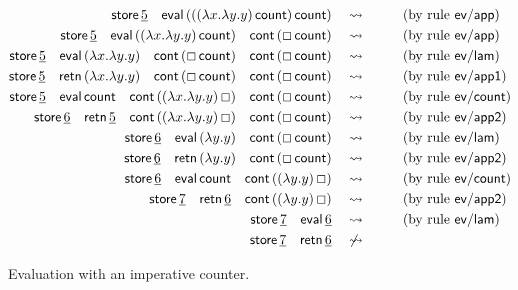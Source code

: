 \begin{figure}
\begin{align*}
{\sf store}\,\underline 5 \quad
{\sf eval}\,(((\lambda x.\lambda y.y)\,{\sf count})\,{\sf count})
& ~~~\rightsquigarrow~~ \tag{by rule ${\sf ev/app}$}\\
{\sf store}\,\underline 5 \quad
{\sf eval}\,((\lambda x.\lambda y.y)\,{\sf count}) \quad
{\sf cont}\,(\Box\,{\sf count})
& ~~~\rightsquigarrow~~ \tag{by rule ${\sf ev/app}$}\\
{\sf store}\,\underline 5 \quad
{\sf eval}\,(\lambda x.\lambda y.y) \quad
{\sf cont}\,(\Box\,{\sf count}) \quad
{\sf cont}\,(\Box\,{\sf count})
& ~~~\rightsquigarrow~~ \tag{by rule ${\sf ev/lam}$}\\
{\sf store}\,\underline 5 \quad
{\sf retn}\,(\lambda x.\lambda y.y) \quad
{\sf cont}\,(\Box\,{\sf count}) \quad
{\sf cont}\,(\Box\,{\sf count})
& ~~~\rightsquigarrow~~ \tag{by rule ${\sf ev/app1}$}\\
{\sf store}\,\underline 5 \quad
{\sf eval}\,{\sf count} \quad
{\sf cont}\,((\lambda x.\lambda y.y)\,\Box) \quad
{\sf cont}\,(\Box\,{\sf count})
& ~~~\rightsquigarrow~~ \tag{by rule ${\sf ev/count}$}\\
{\sf store}\,\underline 6 \quad
{\sf retn}\,\underline 5 \quad
{\sf cont}\,((\lambda x.\lambda y.y)\,\Box) \quad
{\sf cont}\,(\Box\,{\sf count})
& ~~~\rightsquigarrow~~ \tag{by rule ${\sf ev/app2}$}\\
{\sf store}\,\underline 6 \quad
{\sf eval}\,(\lambda y.y) \quad
{\sf cont}\,(\Box\,{\sf count})
& ~~~\rightsquigarrow~~ \tag{by rule ${\sf ev/lam}$}\\
{\sf store}\,\underline 6 \quad
{\sf retn}\,(\lambda y.y) \quad
{\sf cont}\,(\Box\,{\sf count})
& ~~~\rightsquigarrow~~ \tag{by rule ${\sf ev/app2}$}\\
{\sf store}\,\underline 6 \quad
{\sf eval}\,{\sf count} \quad
{\sf cont}\,((\lambda y.y)\,\Box)
& ~~~\rightsquigarrow~~ \tag{by rule ${\sf ev/count}$}\\
{\sf store}\,\underline 7 \quad
{\sf retn}\,\underline 6 \quad
{\sf cont}\,((\lambda y.y)\,\Box)
& ~~~\rightsquigarrow~~ \tag{by rule ${\sf ev/app2}$}\\
{\sf store}\,\underline 7 \quad
{\sf eval}\,\underline 6 
& ~~~\rightsquigarrow~~ \tag{by rule ${\sf ev/lam}$}\\
{\sf store}\,\underline 7 \quad
{\sf retn}\,\underline 6 
& ~~~\not\rightsquigarrow~~ 
\end{align*}
\caption{Evaluation with an imperative counter.}
\label{fig:eval-ssos-ctr}
\end{figure}


